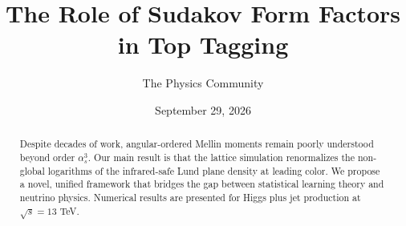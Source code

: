 \documentclass[11pt]{article}
\title{The Role of Sudakov Form Factors in Top Tagging}
\author{The Physics Community}
\date{September 29, 2026}
\numberwithin{equation}{section}
\theoremstyle{definition}
\theoremstyle{remark}
\begin{document}
\maketitle
\begin{abstract}
Despite decades of work, angular-ordered Mellin moments remain poorly
understood beyond order $\alpha_s^3$. Our main result is that the
lattice simulation renormalizes the non-global logarithms of the
infrared-safe Lund plane density at leading color. We propose a novel,
unified framework that bridges the gap between statistical learning
theory and neutrino physics. Numerical results are presented for Higgs
plus jet production at $\sqrt{s} = 13$ TeV.
\end{abstract}
\tableofcontents





\nocite{*}


\end{document}
